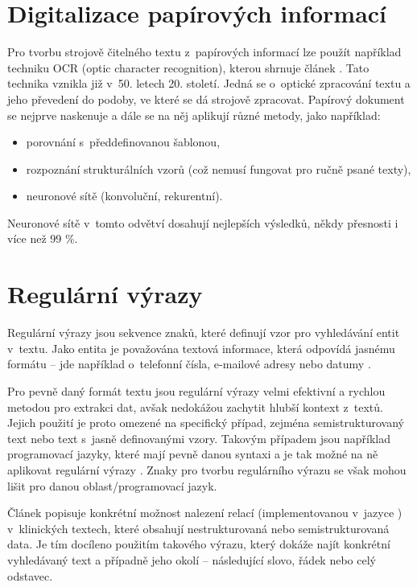 \documentclass[czech, bc, kiv, he, iso690numb, pdf]{fasthesis}
\begin{document}
\section{Digitalizace papírových informací}
Pro tvorbu strojově čitelného textu z~papírových informací lze použít například techniku OCR (optic character recognition), kterou shrnuje článek \cite{ocr}. Tato technika vznikla již v~50. letech 20. století. Jedná se o~optické zpracování textu a jeho převedení do podoby, ve které se dá strojově zpracovat. Papírový dokument se nejprve naskenuje a dále se na něj aplikují různé metody, jako například:
\begin{itemize}
    \item porovnání s~předdefinovanou šablonou,
    \item rozpoznání strukturálních vzorů (což nemusí fungovat pro ručně psané texty),
    \item neuronové sítě (konvoluční, rekurentní).
\end{itemize} 

Neuronové sítě v~tomto odvětví dosahují nejlepších výsledků, někdy přesnosti i více než 99 \%.

\section{Regulární výrazy}
Regulární výrazy jsou sekvence znaků, které definují vzor pro vyhledávání entit v~textu. Jako entita je považována textová informace, která odpovídá jasnému formátu -- jde například o~telefonní čísla, e-mailové adresy nebo datumy \cite{regex-learning-for-info-extraction}.

Pro pevně daný formát textu jsou regulární výrazy velmi efektivní a rychlou metodou pro extrakci dat, avšak nedokážou zachytit hlubší kontext z~textů. Jejich použití je proto omezené na specifický případ, zejména semistrukturovaný text nebo text s~jasně definovanými vzory. Takovým případem jsou například programovací jazyky, které mají pevně danou syntaxi a je tak možné na ně aplikovat regulární výrazy \cite{regular-expressions-oop}. Znaky pro tvorbu regulárního výrazu se však mohou lišit pro danou oblast/programovací jazyk.

Článek \cite{regex-relation-clinical} popisuje konkrétní možnost nalezení relací (implementovanou v~jazyce ) v~klinických textech, které obsahují nestrukturovaná nebo semistrukturovaná data. Je tím docíleno použitím takového výrazu, který dokáže najít konkrétní vyhledávaný text a případně jeho okolí -- následující slovo, řádek nebo celý odstavec.
\end{document}
